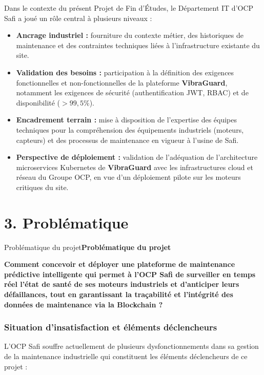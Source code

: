\documentclass[12pt, a4paper, oneside]{report}
\newenvironment{infobox}[1][]{%
  \begin{mdframed}[linewidth=0.8pt, linecolor=black, backgroundcolor=white,
    innerleftmargin=8pt, innerrightmargin=8pt, innertopmargin=6pt, innerbottommargin=6pt,
    nobreak=true]
  \ifx\relax#1\relax\else\textbf{#1}\par\smallskip\fi
}{%
  \end{mdframed}%
}
\newcommand{\projectname}{\textbf{VibraGuard}}
\begin{document}
Dans le contexte du présent Projet de Fin d'Études, le Département IT d'OCP Safi a joué
un rôle central à plusieurs niveaux :

\begin{itemize}
  \item \textbf{Ancrage industriel :} fourniture du contexte métier, des historiques de
  maintenance et des contraintes techniques liées à l'infrastructure existante du site.
  \item \textbf{Validation des besoins :} participation à la définition des exigences
  fonctionnelles et non-fonctionnelles de la plateforme \projectname{}, notamment les
  exigences de sécurité (authentification JWT, RBAC) et de disponibilité ($> 99{,}5\%$).
  \item \textbf{Encadrement terrain :} mise à disposition de l'expertise des équipes
  techniques pour la compréhension des équipements industriels (moteurs, capteurs) et
  des processus de maintenance en vigueur à l'usine de Safi.
  \item \textbf{Perspective de déploiement :} validation de l'adéquation de l'architecture
  microservices Kubernetes de \projectname{} avec les infrastructures cloud et réseau du
  Groupe OCP, en vue d'un déploiement pilote sur les moteurs critiques du site.
\end{itemize}

\vspace{0.5em}

\section*{3. Problématique}

\begin{infobox}[Problématique du projet]
\textbf{Comment concevoir et déployer une plateforme de maintenance prédictive intelligente
qui permet à l'OCP Safi de surveiller en temps réel l'état de santé de ses moteurs industriels
et d'anticiper leurs défaillances, tout en garantissant la traçabilité et l'intégrité des
données de maintenance via la Blockchain ?}
\end{infobox}

\subsubsection*{Situation d'insatisfaction et éléments déclencheurs}

L'OCP Safi souffre actuellement de plusieurs dysfonctionnements dans sa gestion de la
maintenance industrielle qui constituent les éléments déclencheurs de ce projet :
\end{document}
